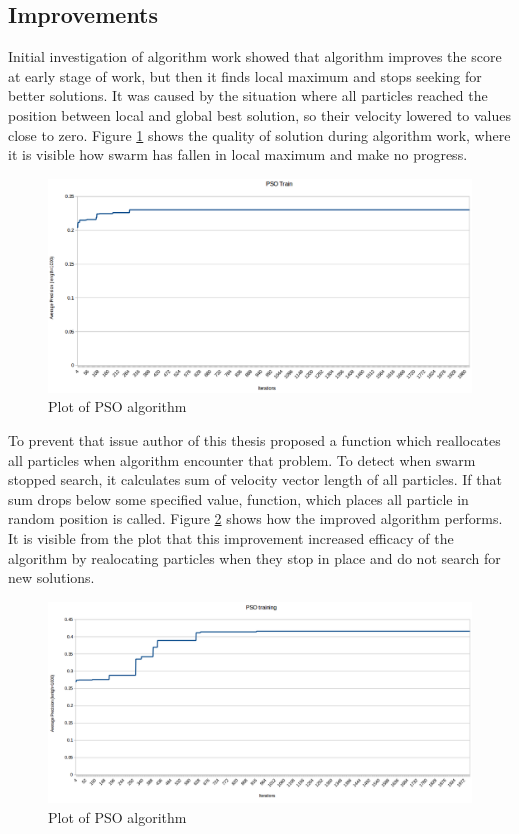 \subsection{Improvements}\label{pso_improv}
Initial investigation of algorithm work showed that algorithm improves the score at early stage of work, but then it finds local maximum 
and stops seeking for better solutions. It was caused by the situation where all particles reached the position between 
local and global best solution, so their velocity lowered to values close to zero. Figure \ref{img_pso_base} shows the quality of solution 
during algorithm work, where it is visible how swarm has fallen in local maximum and make no progress.
\begin{figure}[ht]
\centering
	\includegraphics[scale=0.4]{img/pso_base.png}
	\caption{Plot of PSO algorithm}
	\label{img_pso_base}
\end{figure}

To prevent that issue author of this thesis proposed a function which reallocates all particles when algorithm encounter that problem. 
To detect when swarm stopped search, it calculates sum of velocity vector length of all particles. 
If that sum drops below some specified value, function, which places all particle in random position is called. 
Figure \ref{img_pso_improv} shows how the improved algorithm performs. It is visible from the plot that this improvement 
increased efficacy of the algorithm by realocating particles when they stop in place and do not search for new solutions.
\begin{figure}[ht]
	\centering
	\includegraphics[scale=0.37]{img/pso_improv.png}
	\caption{Plot of PSO algorithm}
	\label{img_pso_improv}
\end{figure}


